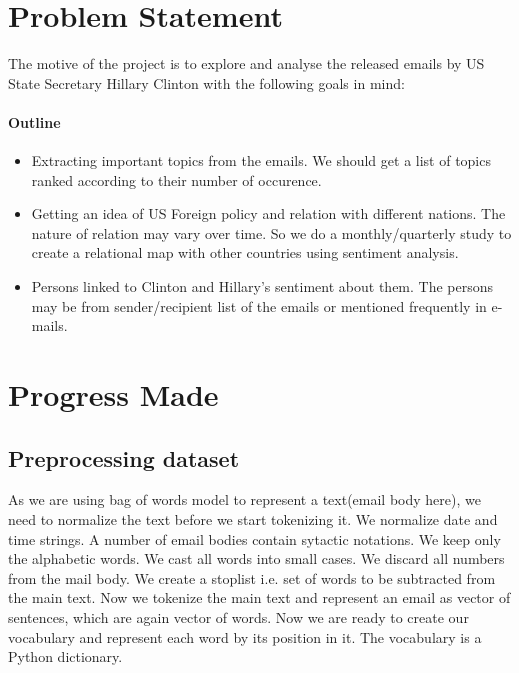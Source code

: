 \documentclass[12pt]{article}
\begin{document}
\maketitle


\section{Problem Statement}
The motive of the project is to explore and analyse the released emails by US State Secretary Hillary Clinton with the following goals in mind:

\paragraph{Outline}
\begin{itemize}
\item Extracting important topics from the emails. We should get a list of topics ranked according to their number of occurence.
\item Getting an idea of US Foreign policy and relation with different nations. The nature of relation may vary over time. So we do a monthly/quarterly study to create a relational map with other countries using sentiment analysis.
\item Persons linked to Clinton and Hillary's sentiment about them. The persons may be from sender/recipient list of the emails or mentioned frequently in e-mails.
\end{itemize}

\section{Progress Made}

\subsection{Preprocessing dataset}
As we are using bag of words model to represent a text(email body here), we need to normalize the text before we start tokenizing it. We normalize date and time strings. A number of email bodies contain sytactic notations. We keep only the alphabetic words. We cast all words into small cases. We discard all numbers from the mail body. We create a stoplist i.e. set of words to be subtracted from the main text. Now we tokenize the main text and represent an email as vector of sentences, which are again vector of words. Now we are ready to create our vocabulary and represent each word by its position in it. The vocabulary is a Python dictionary.
\end{document}
